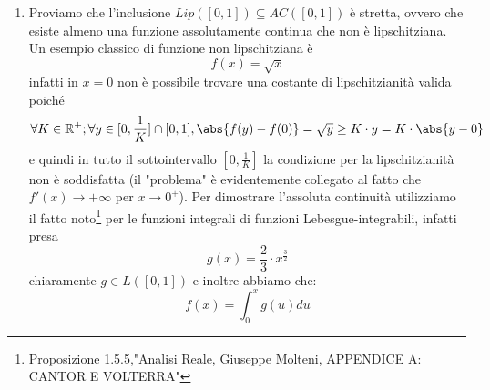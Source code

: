 \begin{enumerate}
\begin{center}
\begin{tikzpicture}[x=6cm, y=1.2cm, line cap=round, line width=2pt]
\end{tikzpicture}
    \end{center}
    La funzione che vogliamo costruire sarà il limite della successione di funzioni monotone definite a partire dagli insiemi intermedi, indicati con $\mathbf{C}_{n,\lambda}$:
    $$f_n(x)=\frac{1}{\abs{C_{n,\lambda}}}\cdot\int_{0}^{x} \chi_{C_{n,\lambda}}(u)\,du$$
    Si può dimostrare \footnote{Vedi "Analisi Reale, Giuseppe Molteni, APPENDICE A: CANTOR E VOLTERRA"} come questa successione di funzioni chiaramente monotone sia di Cauchy in $\mathcal{C}([0,1])$ con la norma del sup, convergendo quindi ad una funzione $f$, anch'essa chiaramente monotona, e quindi sicuramente a variazione limitata.\\
    Questa funzione però non è assolutamente continua e si può vedere ad esempio con la caratterizzazione di queste funzioni data dall'Esercizio 4, infatti, per come è costruita $f$ risulta una funzione a salti sui punti di $[0,1]$ che appartengono a $C_\lambda$, con $f$ suriettiva sul codominio $[0,1]$, abbiamo quindi:
    $$f(C_\lambda)=[0,1]$$
    ma $$\abs{C_\lambda}=0\neq 1
    = \abs{[0,1]}$$
    \item Proviamo che l'inclusione $Lip([0,1])\subseteq AC([0,1])$ è stretta, ovvero che esiste almeno una funzione assolutamente continua che non è lipschitziana.\\
    Un esempio classico di funzione non lipschitziana è $$f(x)=\sqrt{x}$$ infatti in $x=0$ non è possibile trovare una costante di lipschitzianità valida poiché $$\forall K\in\mathbb{R^+}; \forall y\in[0,\frac{1}{K}]\cap [0,1], \abs{f(y)-f(0)}=\sqrt{y}\ge K\cdot y = K\cdot\abs{y-0}$$
    e quindi in tutto il sottointervallo $[0,\frac{1}{K}]$ la condizione per la lipschitzianità non è soddisfatta (il "problema" è evidentemente collegato al fatto che $f'(x)\rightarrow +\infty$ per $x\rightarrow 0^+$).
    Per dimostrare l'assoluta continuità utilizziamo il fatto noto\footnote{Proposizione 1.5.5,"Analisi Reale, Giuseppe Molteni, APPENDICE A: CANTOR E VOLTERRA"} per le funzioni integrali di funzioni Lebesgue-integrabili, infatti presa $$ g(x)= \frac{2}{3}\cdot x^{\frac{3}{2}}$$
    chiaramente $g\in L([0,1])$ e inoltre abbiamo che: $$f(x)=\int_0^x g(u) du$$
   
 \begin{center}
 \end{center} 


\end{enumerate}
